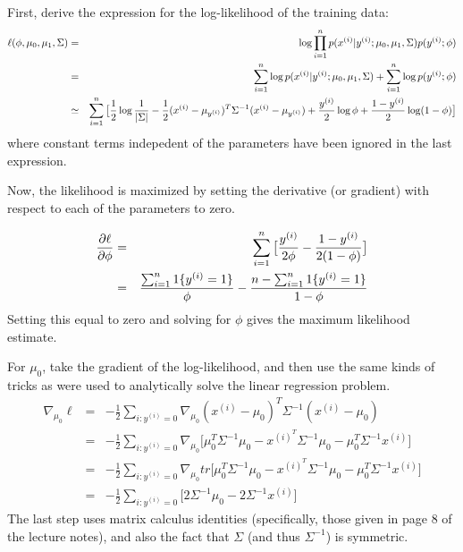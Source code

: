 \begin{answer}
   
First, derive the expression for the log-likelihood of the training
data:
\begin{eqnarray*}
  \ell(\phi, \mu_{0}, \mu_1, \Sigma) &=& \log \prod_{i=1}^\nexp p(x^{(i)} | y^{(i)}; \mu_{0}, \mu_1, \Sigma) p(y^{(i)}; \phi)\\
  &=& \sum_{i=1}^{\nexp} \log p(x^{(i)} | y^{(i)}; \mu_{0}, \mu_1, \Sigma) +
  \sum_{i=1}^{n} \log p(y^{(i)}; \phi)\\
  &\simeq& \sum_{i=1}^{\nexp} \big[\frac{1}{2}\log\frac{1}{|\Sigma|}
  -\frac{1}{2}(x^{(i)}-\mu_{y^{(i)}})^T \Sigma^{-1} (x^{(i)}-\mu_{y^{(i)}})
  + %
    \frac{y^{(i)}}{2} \log \phi + \frac{1-y^{(i)}}{2} \log(1-\phi)\big]
\end{eqnarray*}
where constant terms indepedent of the parameters have been ignored in
the last expression.

Now, the likelihood is maximized by setting the derivative (or
gradient) with respect to each of the parameters to zero.

\begin{eqnarray*}
  \frac{\partial \ell}{\partial \phi} &=&
  \sum_{i=1}^{{n}}\big[\frac{y^{(i)}}{2\phi} - \frac{1-y^{(i)}}{2(1-\phi)}\big]\\
  &=& \frac{\sum_{i=1}^{{n}} 1\{y^{(i)} = 1\}}{\phi} - \frac{{n}-\sum_{i=1}^{{n}} 1\{y^{(i)} = 1\}}{1-\phi}
\end{eqnarray*}
Setting this equal to zero and solving for $\phi$ gives the maximum
likelihood estimate.

For $\mu_{0}$, take the gradient of the log-likelihood, and then use the same kinds of tricks
as were used to analytically solve the linear regression problem.
\begin{eqnarray*}
  \nabla_{\mu_{0}}\ell &=& -\frac{1}{2}\sum_{i:y^{(i)}={0}}
  \nabla_{\mu_{0}}(x^{(i)}-\mu_{0})^T \Sigma^{-1} (x^{(i)}-\mu_{0})\\
  &=& -\frac{1}{2}\sum_{i:y^{(i)}={0}} \nabla_{\mu_{0}}
  \big[ \mu_{0}^T \Sigma^{-1} \mu_{0} - x^{{(i)}^T} \Sigma^{-1} \mu_{0} -
  \mu_{0}^T \Sigma^{-1} x^{(i)}\big]\\
  &=& -\frac{1}{2}\sum_{i:y^{(i)}={0}} \nabla_{\mu_{0}}
  tr \big[ \mu_{0}^T \Sigma^{-1} \mu_{0} - x^{{(i)}^T} \Sigma^{-1} \mu_{0} -
  \mu_{0}^T \Sigma^{-1} x^{(i)}\big]\\
  &=& -\frac{1}{2}\sum_{i:y^{(i)}={0}} \big[
    2 \Sigma^{-1} \mu_{0} - 2 \Sigma^{-1} x^{(i)}
    \big]
\end{eqnarray*}
The last step uses matrix calculus identities (specifically, those
given in page 8 of the lecture notes), and also the fact that $\Sigma$
(and thus $\Sigma^{-1}$) is symmetric.


\end{answer}
